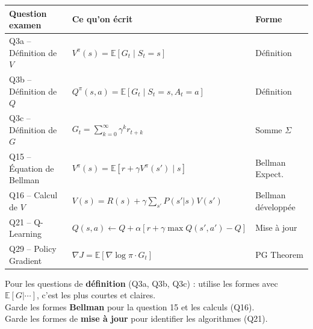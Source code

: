 \documentclass[11pt,a4paper]{article}
\newcommand{\E}{\mathbb{E}}
\begin{document}
\begin{center}
\renewcommand{\arraystretch}{1.4}
\begin{tabular}{lll}
\toprule
\textbf{Question examen} & \textbf{Ce qu'on écrit} & \textbf{Forme} \\
\midrule
Q3a -- Définition de $V$ & $V^\pi(s) = \E[G_t \mid S_t = s]$ & Définition \\
Q3b -- Définition de $Q$ & $Q^\pi(s,a) = \E[G_t \mid S_t = s, A_t = a]$ & Définition \\
Q3c -- Définition de $G$ & $G_t = \sum_{k=0}^{\infty} \gamma^k r_{t+k}$ & Somme $\Sigma$ \\
Q15 -- Équation de Bellman & $V^\pi(s) = \E[r + \gamma V^\pi(s') \mid s]$ & Bellman Expect. \\
Q16 -- Calcul de $V$ & $V(s) = R(s) + \gamma \sum_{s'} P(s'|s) V(s')$ & Bellman développée \\
Q21 -- Q-Learning & $Q(s,a) \leftarrow Q + \alpha[r + \gamma \max Q(s',a') - Q]$ & Mise à jour \\
Q29 -- Policy Gradient & $\nabla J = \E[\nabla \log \pi \cdot G_t]$ & PG Theorem \\
\bottomrule
\end{tabular}
\end{center}

\begin{tipbox}
Pour les questions de \textbf{définition} (Q3a, Q3b, Q3c) : utilise les formes avec $\E[G|\cdots]$, c'est les plus courtes et claires.\\
Garde les formes \textbf{Bellman} pour la question 15 et les calculs (Q16).\\
Garde les formes de \textbf{mise à jour} pour identifier les algorithmes (Q21).
\end{tipbox}
\end{document}
